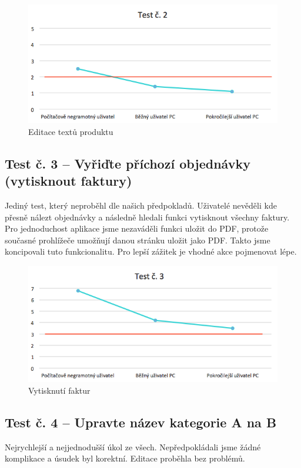 \documentclass[11pt,a4paper]{article}
\begin{document}
\begin{figure}[t]
    \centering
    \includegraphics[width=\textwidth]{t2.png}
    \caption{Editace textů produktu}
\end{figure}

\subsection*{Test č. 3 -- Vyřiďte příchozí objednávky (vytisknout faktury)}
Jediný test, který neproběhl dle našich předpokladů. Uživatelé nevěděli kde přesně nálezt objednávky a následně hledali funkci vytisknout všechny faktury. Pro jednoduchost aplikace jsme nezaváděli funkci uložit do PDF, protože současné prohlížeče umožňují danou stránku uložit jako PDF. Takto jsme koncipovali tuto funkcionalitu. Pro lepší zážitek je vhodné akce pojmenovat lépe.

\begin{figure}[!ht]
    \centering
    \includegraphics[width=\textwidth]{t3.png}
    \caption{Vytisknutí faktur}
\end{figure}
\newpage

\subsection*{Test č. 4 -- Upravte název kategorie A na B}
Nejrychlejší a nejjednodušší úkol ze všech. Nepředpokládali jsme žádné komplikace a úsudek byl korektní. Editace proběhla bez problémů.
\end{document}
